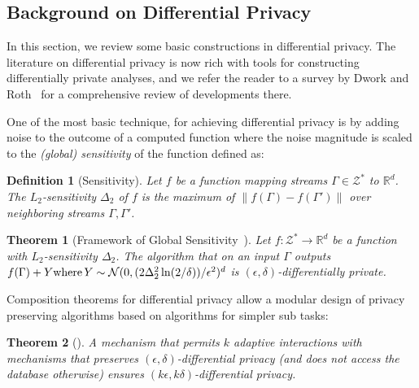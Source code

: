 \documentclass{article}
\theoremstyle{plain}
\newtheorem{theorem}{Theorem}[section]
\newtheorem{definition}{Definition}
\def \eps {\epsilon}
\def \ZZZ {\mathcal{Z}}
\def \NNN {\mathcal{N}}
\def \R {\mathbb{R}}
\begin{document}

\subsection{Background on Differential Privacy} \label{app:dp}
In this section, we review some basic constructions in differential privacy. The literature on differential privacy is now rich with tools for constructing differentially private analyses, and we refer the reader to a survey by Dwork and Roth~\cite{dwork2013algorithmic} for a comprehensive review of developments there.


One of the most basic technique, for achieving differential privacy is by adding noise to the outcome of a computed function where the noise magnitude is scaled to the {\em (global) sensitivity} of the function defined as:
\begin{definition}[Sensitivity] \label{defn:l2sens}
Let $f$ be a function mapping streams $\Gamma \in \ZZZ^\ast$ to $\R^d$. The $L_2$-sensitivity $\Delta_2$ of $f$ is the maximum of $\|f(\Gamma)-f(\Gamma')\|$ over neighboring streams $\Gamma,\Gamma'$. 
\end{definition}

\begin{theorem}[Framework of Global Sensitivity~\cite{DMNS06}]\label{thm:sens} Let $f: \ZZZ^\ast \rightarrow \R^d$ be a function with $L_2$-sensitivity $\Delta_2$. The algorithm that on an input $\Gamma$ outputs $f(\Gamma) + Y \mbox{\rm where}\, Y\sim \NNN(0,(2 \Delta_2^2 \ln(2/\delta))/\eps^2)^d$ is $(\epsilon,\delta)$-differentially private. 
\end{theorem}

Composition theorems for differential privacy allow a modular design of privacy preserving algorithms based on algorithms for simpler sub tasks:

\begin{theorem}[\cite{DKMMN06}]\label{thm:composition1}
A mechanism that permits $k$ adaptive interactions with mechanisms that preserves $(\epsilon,\delta)$-differential privacy (and does not access the database otherwise) ensures $(k\epsilon, k\delta)$-differential privacy.
\end{theorem}
\end{document}
